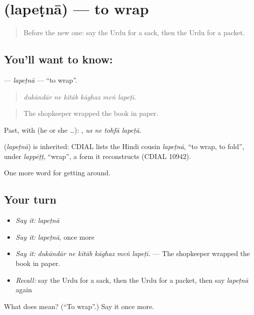 \section[\texorpdfstring{\ur{لپیٹنا} (lapeṭnā)}{لپیٹنا (lapeṭnā)}]{ (lapeṭnā) — to wrap}

\label{lesson:UR-C424-lapetna}



\begin{quote}
Before the new one: say the Urdu for a sack, then the Urdu for a packet.
\end{quote}

\subsection*{You'll want to know: }
\textbf{} — \emph{lapeṭnā} — \textquotedblleft{}to wrap\textquotedblright{}.

\begin{quote}
     
\end{quote}

\begin{quote}
\emph{dukāndār ne kitāb kāghaz meṅ lapeṭī.}
\end{quote}

\begin{quote}
The shopkeeper wrapped the book in paper.
\end{quote}

Past, with  (he or she …):    , \emph{us ne tohfā lapeṭā}.

\begin{cousinweb}
\textbf{} (\emph{lapeṭnā}) is inherited: CDIAL lists the Hindi cousin \emph{lapeṭnā}, \textquotedblleft{}to wrap, to fold\textquotedblright{}, under \emph{lappēṭṭ}, \textquotedblleft{}wrap\textquotedblright{}, a form it reconstructs (CDIAL 10942).
\end{cousinweb}

\begin{grammarlens}[title={What you've built}]
One more word for getting around.
\end{grammarlens}

\subsection*{Your turn}
\begin{itemize}
\raggedright
  \item \emph{Say it:} \emph{lapeṭnā}
  \item \emph{Say it:} \emph{lapeṭnā}, once more
  \item \emph{Say it:} \emph{dukāndār ne kitāb kāghaz meṅ lapeṭī.} — The shopkeeper wrapped the book in paper.
  \item \emph{Recall:} say the Urdu for a sack, then the Urdu for a packet, then say \emph{lapeṭnā} again
\end{itemize}

\begin{tcolorbox}[breakable,colback=teal!4,colframe=teal!35!black,title={Before you move on}]
What does  mean? (\textquotedblleft{}To wrap\textquotedblright{}.) Say it once more.
\end{tcolorbox}
